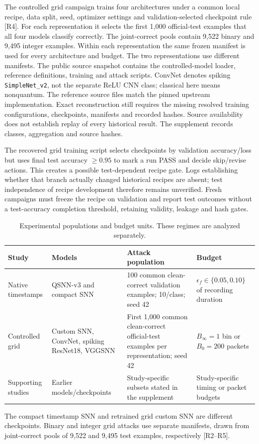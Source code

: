 The controlled grid campaign trains four architectures under a common local recipe, data split, seed, optimizer settings and validation-selected checkpoint rule [R4]. For each representation it selects the first 1,000 official-test examples that all four models classify correctly. The joint-correct pools contain 9,522 binary and 9,495 integer examples. Within each representation the same frozen manifest is used for every architecture and budget. The two representations use different manifests. The public source snapshot contains the controlled-model loader, reference definitions, training and attack scripts. ConvNet denotes spiking \texttt{SimpleNet\_v2}, not the separate ReLU CNN class; classical here means nonquantum. The reference source files match the pinned upstream implementation. Exact reconstruction still requires the missing resolved training configurations, checkpoints, manifests and recorded hashes. Source availability does not establish replay of every historical result. The supplement records classes, aggregation and source hashes.

The recovered grid training script selects checkpoints by validation accuracy/loss but uses final test accuracy $\geq0.95$ to mark a run PASS and decide skip/revise actions. This creates a possible test-dependent recipe gate. Logs establishing whether that branch actually changed historical recipes are absent; test independence of recipe development therefore remains unverified. Fresh campaigns must freeze the recipe on validation and report test outcomes without a test-accuracy completion threshold, retaining validity, leakage and hash gates.


\begin{table}[t]\centering
\caption{Experimental populations and budget units. These regimes are analyzed separately.}\label{tab:populations}
\small\begin{tabularx}{\textwidth}{>{\raggedright\arraybackslash}p{}L L >{\raggedright\arraybackslash}p{.21\textwidth}}\toprule
\textbf{Study} & \textbf{Models} & \textbf{Attack population} & \textbf{Budget}\\\midrule
Native timestamps & QSNN-v3 and compact SNN & 100 common clean-correct validation examples; 10/class; seed 42 & $\epsilon_f\in\{0.05,0.10\}$ of recording duration\\
Controlled grid & Custom SNN, ConvNet, spiking ResNet18, VGGSNN & First 1,000 common clean-correct official-test examples per representation; seed 42 & $B_\infty=1$ bin or $B_0=200$ packets\\
Supporting studies & Earlier models/checkpoints & Study-specific subsets stated in the supplement & Study-specific timing or packet budgets\\\bottomrule
\end{tabularx}
\vspace{3pt}\begin{minipage}{\textwidth}\footnotesize
The compact timestamp SNN and retrained grid custom SNN are different checkpoints. Binary and integer grid attacks use separate manifests, drawn from joint-correct pools of 9,522 and 9,495 test examples, respectively [R2--R5].
\end{minipage}\end{table}

